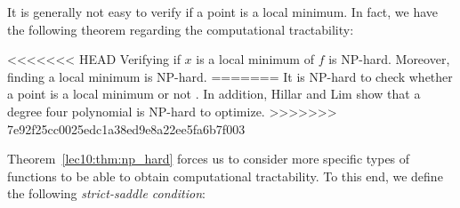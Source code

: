 It is generally not easy to verify if a point is a local minimum. In fact, we have the following theorem regarding the computational tractability:
\begin{theorem}
\label{lec10:thm:np_hard}
<<<<<<< HEAD
Verifying if $x$ is a local minimum of $f$ is NP-hard.  Moreover, finding a local minimum is NP-hard.
=======
It is NP-hard to check whether a point is a local minimum or not \cite{murty1987}. In addition, Hillar and Lim \cite{hillar2013} show that a degree four polynomial is NP-hard to optimize.
>>>>>>> 7e92f25cc0025edc1a38ed9e8a22ee5fa6b7f003
\end{theorem}

Theorem~\ref{lec10:thm:np_hard} forces us to consider more specific types of functions to be able to obtain computational tractability. To this end, we define the following \textit{strict-saddle condition}:

